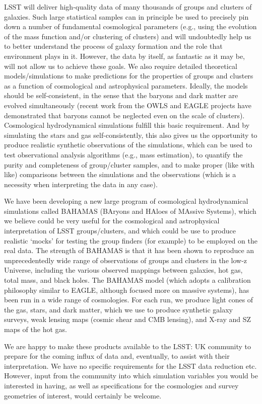 \documentclass[a4paper,11pt]{article}
\begin{document}
LSST will deliver high-quality data of many thousands of groups and clusters of galaxies.  Such large statistical samples can in principle be used to precisely pin down a number of fundamental cosmological parameters (e.g., using the evolution of the mass function and/or clustering of clusters) and will undoubtedly help us to better understand the process of galaxy formation and the role that environment plays in it.  However, the data by itself, as fantastic as it may be, will not allow us to achieve these goals.  We also require detailed theoretical models/simulations to make predictions for the properties of groups and clusters as a function of cosmological and astrophysical parameters.  Ideally, the models should be self-consistent, in the sense that the baryons and dark matter are evolved simultaneously (recent work from the OWLS and EAGLE projects have demonstrated that baryons cannot be neglected even on the scale of clusters).  Cosmological hydrodynamical simulations fulfill this basic requirement.  And by simulating the stars and gas self-consistently, this also gives us the opportunity to produce realistic synthetic observations of the simulations, which can be used to test observational analysis algorithms (e.g., mass estimation), to quantify the purity and completeness of group/cluster samples, and to make proper (like with like) comparisons between the simulations and the observations (which is a necessity when interpreting the data in any case).

We have been developing a new large program of cosmological hydrodynamical simulations called BAHAMAS (BAryons and HAloes of MAssive Systems), which we believe could be very useful for the cosmological and astrophysical interpretation of LSST groups/clusters, and which could be use to produce realistic `mocks' for testing the group finders (for example) to be employed on the real data.  The strength of BAHAMAS is that it has been shown to reproduce an unprecedentedly wide range of observations of groups and clusters in the low-z Universe, including the various observed mappings between galaxies, hot gas, total mass, and black holes.  The BAHAMAS model (which adopts a calibration philosophy similar to EAGLE, although focused more on massive systems), has been run in a wide range of cosmologies.  For each run, we produce light cones of the gas, stars, and dark matter, which we use to produce synthetic galaxy surveys, weak lensing maps (cosmic shear and CMB lensing), and X-ray and SZ maps of the hot gas.

We are happy to make these products available to the LSST: UK community to prepare for the coming influx of data and, eventually, to assist with their interpretation.  We have no specific requirements for the LSST data reduction etc.  However, input from the community into which simulation variables you would be interested in having, as well as specifications for the cosmologies and survey geometries of interest, would certainly be welcome.
\end{document}
